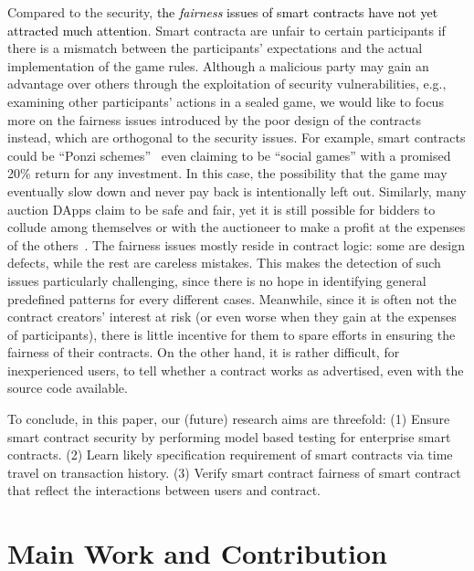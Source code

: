 Compared to the security, \textcolor{black}{the \emph{fairness} issues of smart contracts have not yet attracted much attention}.
Smart contracta are unfair to certain participants if there is a mismatch between the participants' expectations and the actual implementation of the game rules.
Although a malicious party may gain an advantage over others through the exploitation of security vulnerabilities, e.g., examining other participants' actions in a sealed game,
we would like to focus more on the fairness issues introduced by the poor design of the contracts instead, which are orthogonal to the security issues.
For example, smart contracts could be ``Ponzi schemes''~\cite{BARTOLETTI2020259} even claiming to be ``social games'' with a promised 20\% return for any investment.
In this case, the possibility that the game may eventually slow down and never pay back is intentionally left out.
Similarly, many auction DApps claim to be safe and fair, yet it is still possible for bidders to collude among themselves or with the auctioneer to make a profit at the expenses of the others~\cite{wu2018cream}.
The fairness issues mostly reside in contract logic: some are design defects, while the rest are careless mistakes.
This makes the detection of such issues particularly challenging, since there is no hope in identifying general predefined patterns for every different cases.
Meanwhile, since it is often not the contract creators' interest at risk (or even worse when they gain at the expenses of participants), there is little incentive for them to spare efforts in ensuring the fairness of their contracts.
On the other hand, it is rather difficult, for inexperienced users, to tell whether a contract works as advertised, even with the source code available.

To conclude, in this paper, our (future) research aims are threefold:
(1) Ensure smart contract security by performing model based testing for enterprise smart contracts. 
(2) Learn likely specification requirement of smart contracts via time travel on transaction history. 
(3) Verify smart contract fairness of smart contract that reflect the interactions between users and contract.


\section{Main Work and Contribution}

